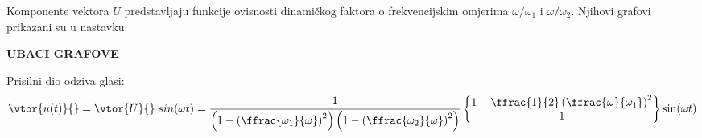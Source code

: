 
Komponente vektora $U$ predstavljaju funkcije ovisnosti dinamičkog faktora o 
frekvencijskim omjerima $\omega/\omega_1$ i $\omega/\omega_2$. Njihovi grafovi
prikazani su u nastavku.

\textbf{UBACI GRAFOVE}

Prisilni dio odziva glasi:
\begin{equation}
    \begin{split}
        \vtor{u(t)}{} = \vtor{U}{}\; sin(\omega t)
        =
        \frac{1}{\left(1-\left(\ffrac{\omega_1}{\omega}\right)^2\right)\left(1-\left(\ffrac{\omega_2}{\omega}\right)^2\right)}
    \begin{Bmatrix}
        1-\ffrac{1}{2}\left(\ffrac{\omega}{\omega_1}\right)^2\\
        1 
    \end{Bmatrix}
    \sin(\omega t)
    \end{split}
\end{equation}
